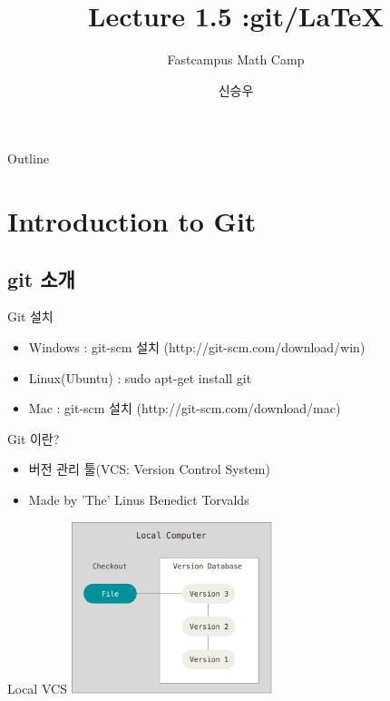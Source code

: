 \documentclass{beamer}
\title{Lecture 1.5 :git/LaTeX}
\subtitle{Fastcampus Math Camp}
\author{신승우}
\begin{document}
\begin{frame}
  \titlepage
\end{frame}

\begin{frame}{Outline}
  \tableofcontents[hideallsubsections]
\end{frame}


\section{Introduction to Git} 

\subsection{git 소개} 

\begin{frame}{Git 설치}
\begin{itemize} 
\item Windows : git-scm 설치 (http://git-scm.com/download/win)
\item Linux(Ubuntu) : sudo apt-get install git
\item Mac : git-scm 설치 (http://git-scm.com/download/mac)
\end{itemize}
\end{frame}

\begin{frame}{Git 이란?}
\begin{itemize}
\item 버전 관리 툴(VCS: Version Control System)
\item Made by 'The' Linus Benedict Torvalds
\end{itemize}
\end{frame}

\begin{frame}{Local VCS}
\includegraphics[height=5cm,keepaspectratio]{local}
\end{frame}
\end{document}

